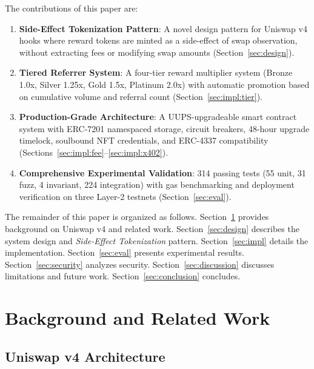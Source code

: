 \documentclass[conference]{IEEEtran}
\begin{document}
The contributions of this paper are:

\begin{enumerate}
    \item \textbf{Side-Effect Tokenization Pattern}: A novel design pattern for Uniswap v4 hooks where reward tokens are minted as a side-effect of swap observation, without extracting fees or modifying swap amounts (Section~\ref{sec:design}).

    \item \textbf{Tiered Referrer System}: A four-tier reward multiplier system (Bronze 1.0x, Silver 1.25x, Gold 1.5x, Platinum 2.0x) with automatic promotion based on cumulative volume and referral count (Section~\ref{sec:impl:tier}).

    \item \textbf{Production-Grade Architecture}: A UUPS-upgradeable smart contract system with ERC-7201 namespaced storage, circuit breakers, 48-hour upgrade timelock, soulbound NFT credentials, and ERC-4337 compatibility (Sections~\ref{sec:impl:fee}--\ref{sec:impl:x402}).

    \item \textbf{Comprehensive Experimental Validation}: 314 passing tests (55 unit, 31 fuzz, 4 invariant, 224 integration) with gas benchmarking and deployment verification on three Layer-2 testnets (Section~\ref{sec:eval}).
\end{enumerate}

The remainder of this paper is organized as follows. Section~\ref{sec:background} provides background on Uniswap v4 and related work. Section~\ref{sec:design} describes the system design and \textit{Side-Effect Tokenization} pattern. Section~\ref{sec:impl} details the implementation. Section~\ref{sec:eval} presents experimental results. Section~\ref{sec:security} analyzes security. Section~\ref{sec:discussion} discusses limitations and future work. Section~\ref{sec:conclusion} concludes.

\section{Background and Related Work}
\label{sec:background}

\subsection{Uniswap v4 Architecture}
\end{document}
